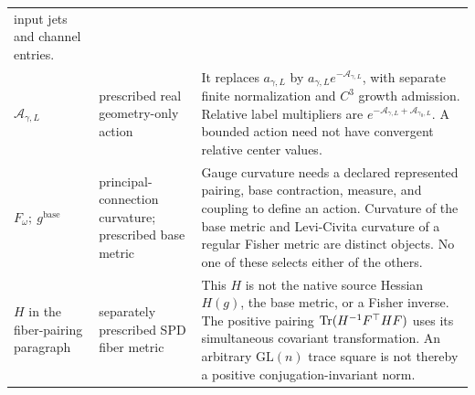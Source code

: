 \begin{longtable}{@{}>{\raggedright\arraybackslash}p{}
>{\raggedright\arraybackslash}p{}
>{\raggedright\arraybackslash}p{}@{}}
input jets and channel entries. \\
\(\mathscr A_{\gamma,L}\) &
prescribed real geometry-only action &
It replaces \(a_{\gamma,L}\) by
\(a_{\gamma,L}e^{-\mathscr A_{\gamma,L}}\), with separate finite
normalization and \(C^3\) growth admission. Relative label multipliers
are \(e^{-\mathscr A_{\gamma,L}+\mathscr A_{\gamma_0,L}}\).
A bounded action need not have convergent relative center values. \\
\(F_\omega;\ g^{\mathrm{base}}\) &
principal-connection curvature; prescribed base metric &
Gauge curvature needs a declared represented pairing, base contraction,
measure, and coupling to define an action. Curvature of the base metric
and Levi-Civita curvature of a regular Fisher metric are distinct objects.
No one of these selects either of the others. \\
\(H\) in the fiber-pairing paragraph &
separately prescribed SPD fiber metric &
This \(H\) is not the native source Hessian \(H(g)\), the base metric,
or a Fisher inverse. The positive pairing
\(\operatorname{Tr}(H^{-1}F^\top HF)\) uses its simultaneous covariant transformation.
An arbitrary \(\mathrm{GL}(n)\) trace square is not thereby a positive
conjugation-invariant norm. \\


\end{longtable}
